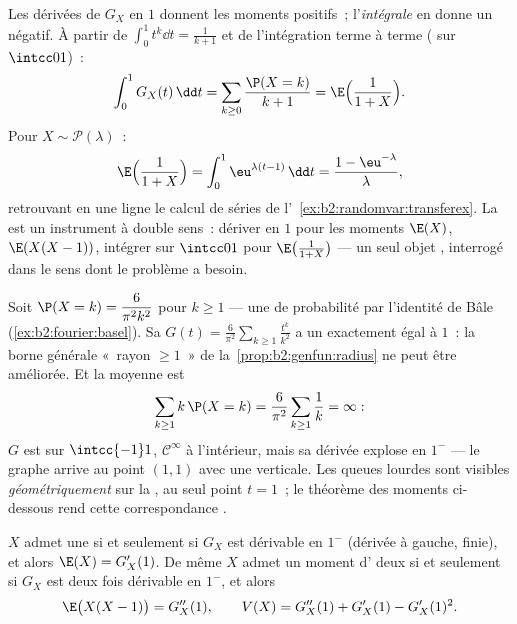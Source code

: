 \begin{example}\label{ex:b2:genfun:integraltrick}
Les dérivées de $G_X$ en $1$ donnent les moments positifs~;
l'\emph{intégrale} en donne un négatif. À partir de $\int_0^1t^k\dd t
= \frac1{k+1}$ et de l'intégration terme à terme ( sur $\intcc01$)~:
\[
\int_0^1G_X(t)\,\dd t = \sum_{k\geq0}\frac{\P(X =
k)}{k+1} = \E\Bigl(\frac1{1+X}\Bigr).
\]
Pour $X \sim \mathcal P(\lambda)$~:
\[
\E\Bigl(\frac1{1+X}\Bigr) =
\int_0^1\eu^{\lambda(t-1)}\,\dd t = \frac{1 -
\eu^{-\lambda}}{\lambda},
\]
retrouvant en une ligne le calcul de séries de
l'~\cref{ex:b2:randomvar:transferex}. La 
est un instrument à double sens~: dériver en $1$ pour les
moments $\E(X)$, $\E(X(X-1))$, intégrer sur $\intcc01$
pour $\E\bigl(\frac1{1+X}\bigr)$ --- un seul objet ,
interrogé dans le sens dont le problème a besoin.
\end{example}

\begin{example}\label{ex:b2:genfun:heavytail}
Soit $\P(X = k) = \dfrac{6}{\pi^2k^2}$ pour $k \geq 1$ --- une
 de probabilité par l'identité de Bâle
(\cref{ex:b2:fourier:basel}). Sa 
$G(t) = \frac6{\pi^2}\sum_{k\geq1}\frac{t^k}{k^2}$ a un  exactement égal à $1$~: la borne générale «~rayon
$\geq 1$~» de la~\cref{prop:b2:genfun:radius} ne peut être améliorée.
Et la moyenne est
\[
\sum_{k\geq1}k\,\P(X = k) =
\frac6{\pi^2}\sum_{k\geq1}\frac1k = \infty :
\]
$G$ est  sur $\intcc{-1}1$, $\mathcal C^\infty$ à
l'intérieur, mais sa dérivée explose en $1^-$ --- le graphe arrive au
point $(1, 1)$ avec une  verticale. Les queues lourdes sont
visibles \emph{géométriquement} sur la , au
seul point $t = 1$~; le théorème des moments ci-dessous rend
cette correspondance .
\end{example}

\begin{theorem}\label{thm:b2:genfun:moments}
$X$ admet une  si et seulement si $G_X$ est dérivable en
$1^-$ (dérivée à gauche, finie), et alors $\E(X) = G_X'(1)$.
De même $X$ admet un moment d' deux si et seulement si $G_X$
est deux fois dérivable en $1^-$, et alors
\[
\E\bigl(X(X - 1)\bigr) = G_X''(1),
\qquad
V(X) = G_X''(1) + G_X'(1) - G_X'(1)^2 .
\]
\end{theorem}

